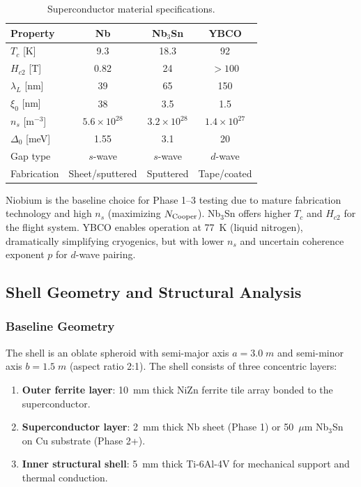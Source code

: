 \documentclass[twocolumn,prl,superscriptaddress,nofootinbib,longbibliography,floatfix]{revtex4-2}
\begin{document}
\begin{table}[h]
\centering
\caption{Superconductor material specifications.}
\label{tab:superconductor}
\begin{ruledtabular}
\begin{tabular}{lccc}
Property & Nb & Nb$_3$Sn & YBCO \\
\hline
$T_c$ [K] & 9.3 & 18.3 & 92 \\
$H_{c2}$ [T] & 0.82 & 24 & $> 100$ \\
$\lambda_L$ [nm] & 39 & 65 & 150 \\
$\xi_0$ [nm] & 38 & 3.5 & 1.5 \\
$n_s$ [m$^{-3}$] & $5.6 \times 10^{28}$ &
$3.2 \times 10^{28}$ & $1.4 \times 10^{27}$ \\
$\Delta_0$ [meV] & 1.55 & 3.1 & 20 \\
Gap type & $s$-wave & $s$-wave & $d$-wave \\
Fabrication & Sheet/sputtered & Sputtered & Tape/coated \\
\end{tabular}
\end{ruledtabular}
\end{table}

Niobium is the baseline choice for Phase 1--3 testing due to mature
fabrication technology and high $n_s$ (maximizing $N_{\rm Cooper}$).
Nb$_3$Sn offers higher $T_c$ and $H_{c2}$ for the flight system.  YBCO
enables operation at 77~K (liquid nitrogen), dramatically simplifying
cryogenics, but with lower $n_s$ and uncertain coherence exponent $p$
for $d$-wave pairing.

\subsection{Shell Geometry and Structural Analysis}

\subsubsection{Baseline Geometry}

The shell is an oblate spheroid with semi-major axis $a = 3.0\;\si{m}$
and semi-minor axis $b = 1.5\;\si{m}$ (aspect ratio 2:1).  The shell
consists of three concentric layers:

\begin{enumerate}[nosep]
\item \textbf{Outer ferrite layer}: 10~mm thick NiZn ferrite tile array
bonded to the superconductor.
\item \textbf{Superconductor layer}: 2~mm thick Nb sheet (Phase 1) or
50~$\mu$m Nb$_3$Sn on Cu substrate (Phase 2+).
\item \textbf{Inner structural shell}: 5~mm thick Ti-6Al-4V for
mechanical support and thermal conduction.
\end{enumerate}
\end{document}
